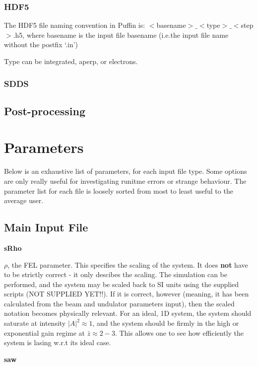 \documentclass[12pt]{article}%
\begin{document}
\subsubsection{HDF5}

The HDF5 file naming convention in Puffin is: $<$basename$>\_<$type$>\_<$step$>$.h5, where basename is the input file basename (i.e.the input file name without the postfix `.in')

Type can be integrated, aperp, or electrons.

\subsubsection{SDDS}

\subsection{Post-processing}

\newpage

\section{Parameters}

Below is an exhaustive list of parameters, for each input file type. Some options are only really useful for investigating runitme errors or strange behaviour. The parameter list for each file is loosely sorted from most to least useful to the average user.


\subsection{Main Input File}

{\bf sRho}

$\rho$, the FEL parameter. This specifies the scaling of the system. It does {\bf not} have to be strictly correct - it only descibes the scaling. The simulation can be performed, and the system may be scaled back to SI units using the supplied scripts (NOT SUPPLIED YET!!). If it is correct, however (meaning, it has been calculated from the beam and undulator parameters input), then the scaled notation becomes physically relevant. For an ideal, 1D system, the system should saturate at intensity $|A|^2 \approx 1$, and the system should be firmly in the high or exponential gain regime at $\bar{z} \approx 2-3$. This allows one to see how efficiently the system is lasing w.r.t its ideal case.


{\bf saw}
\end{document}
